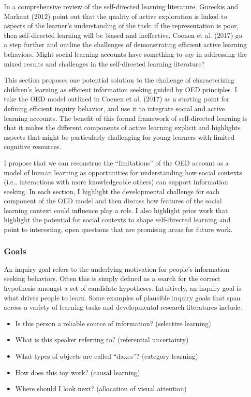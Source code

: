 \documentclass[english,floatsintext,man]{apa6}
\providecommand{\tightlist}{%
  \setlength{\itemsep}{0pt}\setlength{\parskip}{0pt}}
\theoremstyle{definition}
\theoremstyle{definition}
\theoremstyle{definition}
\theoremstyle{remark}
\begin{document}
In a comprehensive review of the self-directed learning literature,
Gureckis and Markant (2012) point out that the quality of active
exploration is linked to aspects of the learner's understanding of the
task: if the representation is poor, then self-directed learning will be
biased and ineffective. Coenen et al. (2017) go a step further and
outline the challenges of demonstrating efficient active learning
behaviors. Might social learning accounts have something to say in
addressing the mixed results and challenges in the self-directed
learning literature?

This section proposes one potential solution to the challenge of
characterizing children's learning as efficient information seeking
guided by OED principles. I take the OED model outlined in Coenen et al.
(2017) as a starting point for defining efficient inquiry behavior, and
use it to integrate social and active learning accounts. The benefit of
this formal framework of self-directed learning is that it makes the
different components of active learning explicit and highlights aspects
that might be particularly challenging for young learners with limited
cognitive resources.

I propose that we can reconstrue the \enquote{limitations} of the OED
account as a model of human learning as opportunities for understanding
how social contexts (i.e., interactions with more knowledgeable others)
can support information seeking. In each section, I highlight the
developmental challenge for each component of the OED model and then
discuss how features of the social learning context could influence play
a role. I also highlight prior work that highlight the potential for
social contexts to shape self-directed learning and point to
interesting, open questions that are promising areas for future work.

\subsubsection{Goals}\label{goals}

An inquiry goal refers to the underlying motivation for people's
information seeking behaviors. Often this is simply defined as a search
for the correct hypothesis amongst a set of candidate hypotheses.
Intuitively, an inquiry goal is what drives people to learn. Some
examples of plausible inquiry goals that span across a variety of
learning tasks and developmental research literatures include:

\begin{itemize}
\tightlist
\item
  Is this person a reliable source of information? (selective learning)
\item
  What is this speaker referring to? (referential uncertainty)
\item
  What types of objects are called \enquote{daxes}? (category learning)
\item
  How does this toy work? (causal learning)
\item
  Where should I look next? (allocation of visual attention)
\end{itemize}
\end{document}
